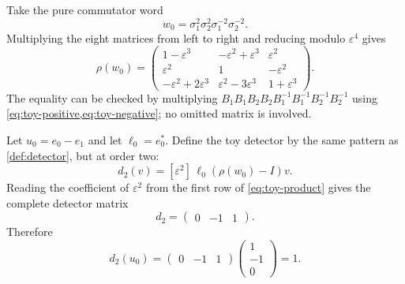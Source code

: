 \documentclass[10pt,reqno]{amsart}
\theoremstyle{definition}
\theoremstyle{remark}
\newcommand{\eps}{\varepsilon}
\begin{document}
Take the pure commutator word
\begin{equation}\label{eq:toy-word}
w_0=\sigma_1^2\sigma_2^2\sigma_1^{-2}\sigma_2^{-2}.
\end{equation}
Multiplying the eight matrices from left to right and reducing modulo
$\eps^4$ gives
\begin{equation}\label{eq:toy-product}
\rho(w_0)=
\begin{pmatrix}
1-\eps^3&-\eps^2+\eps^3&\eps^2\\
\eps^2&1&-\eps^2\\
-\eps^2+2\eps^3&\eps^2-3\eps^3&1+\eps^3
\end{pmatrix}.
\end{equation}
The equality can be checked by multiplying
$B_1B_1B_2B_2B_1^{-1}B_1^{-1}B_2^{-1}B_2^{-1}$ using
\cref{eq:toy-positive,eq:toy-negative}; no omitted matrix is involved.

Let $u_0=e_0-e_1$ and let $\ell_0=e_0^*$.  Define the toy detector by the
same pattern as \cref{def:detector}, but at order two:
\begin{equation}\label{eq:toy-detector}
d_2(v)=[\eps^2]\,\ell_0(\rho(w_0)-I)v.
\end{equation}
Reading the coefficient of $\eps^2$ from the first row of
\cref{eq:toy-product} gives the complete detector matrix
\begin{equation}\label{eq:toy-row}
d_2=\begin{pmatrix}0&-1&1\end{pmatrix}.
\end{equation}
Therefore
\begin{equation}\label{eq:toy-selected}
d_2(u_0)=
\begin{pmatrix}0&-1&1\end{pmatrix}
\begin{pmatrix}1\\-1\\0\end{pmatrix}=1.
\end{equation}
\end{document}
